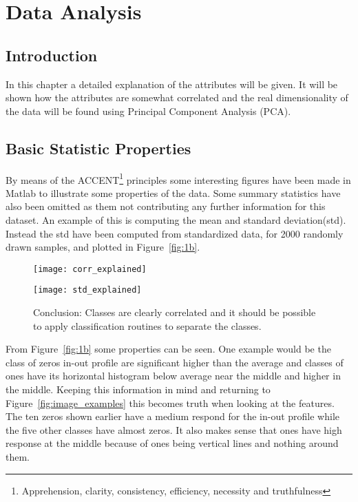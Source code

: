 \chapter{Data Analysis}

\section{Introduction}
In this chapter a detailed explanation of the attributes will be given. It will be shown how the attributes are somewhat correlated and the real dimensionality of the data will be found using Principal Component Analysis (PCA). 

\section{Basic Statistic Properties}
By means of the ACCENT\footnote{Apprehension, clarity, consistency, efficiency, necessity and truthfulness} principles some interesting figures have been made in Matlab to illustrate some properties of the data. Some summary statistics have also been omitted as them not contributing any further information for this dataset. An example of this is computing the mean and standard deviation(std). Instead the std have been computed from standardized data, for 2000 randomly drawn samples, and plotted in Figure~\ref{fig:1b}. 
 
\begin{figure}[H]
\begin{minipage}[t]{.49\linewidth}
\centering
\texttt{[image: corr\_explained]}
\end{minipage}%
\hfill%
\begin{minipage}[t]{.49\linewidth}
\centering
\texttt{[image: std\_explained]}
\end{minipage}
\caption{Conclusion: Classes are clearly correlated and it should be possible to apply classification routines to separate the classes. }
\end{figure}

From Figure~\ref{fig:1b} some properties can be seen. One example would be the class of zeros in-out profile are significant higher than the average and classes of ones have its horizontal histogram below average near the middle and higher in the middle. Keeping this information in mind and returning to Figure~\ref{fig:image_examples} this becomes truth when looking at the features. The ten zeros shown earlier have a medium respond for the in-out profile while the five other classes have almost zeros. It also makes sense that ones have high response at the middle because of ones being vertical lines and nothing around them.

